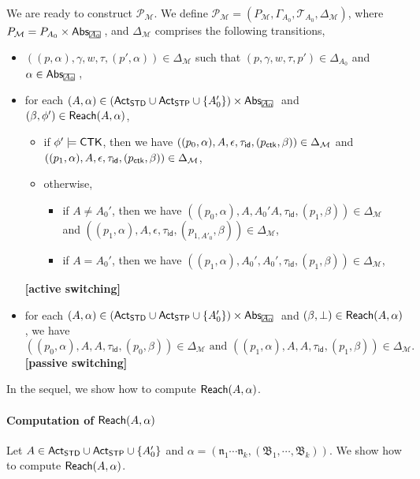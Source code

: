 \documentclass[preprint,12pt]{elsarticle}
\newcommand\rectangled[1]{\tikz[baseline=(torect.base)]{
    \node[shape = rectangle, draw, inner sep=0pt, outer sep = 0pt] (torect) {#1}
    }
}
\newcommand{\mrectangled}[1]{\text{\rectangled{\ensuremath{#1}}}}
\newcommand{\mhcancel}[1]{\mrectangled{#1}}
\newcommand\Mm{{\mathcal{M} }}
\newcommand\Pp{{\mathcal{P} }}
\newcommand\act{{\sf Act}}
\newcommand\standard{{\sf STD}}
\newcommand\singletop{{\sf STP}}
\newcommand\ctkflag{{\sf CTK}}
\newcommand\abs{{\mathsf{Abs} }}
\newcommand\aname{\mathfrak{n}}
\newcommand\reach{{\sf Reach}}
\newcommand{\id}{\mathsf{id}}
\newcommand\AutB{{\mathfrak{B} }}
\newcommand\TranSet{{\mathscr{T} }}
\begin{document}
We are ready to construct $\Pp_\Mm$. 
We define $\Pp_{\Mm} = (P_{\Mm}, \Gamma_{A_0}, \TranSet_{A_0}, \Delta_{\Mm})$, where $P_{\Mm} = P_{A_0} \times \abs_{\mhcancel{A_0}}$, and $\Delta_{\Mm}$ comprises the following transitions,
\begin{itemize}
    \item $((p, \alpha), \gamma, w, \tau, (p', \alpha)) \in \Delta_{\Mm}$ such that $(p, \gamma, w, \tau, p') \in \Delta_{A_0}$ and $\alpha\in\abs_{\mhcancel{A_0}}$,
    \item for each $(A, \alpha) \in (\act_{\standard} \cup \act_{\singletop} \cup \{A_0'\}) \times \abs_{\mhcancel{A_0}}$ and $(\beta,\phi')\in\reach(A,\alpha)$, 
        \begin{itemize}
            \item if $\phi' \models \ctkflag$, then we have $((p_0, \alpha), A, \epsilon, \tau_{\id}, (p_{\sf ctk}, \beta)) \in \Delta_{\Mm}$ and $((p_1, \alpha), A, \epsilon, \tau_{\id}, (p_{\sf ctk}, \beta)) \in \Delta_{\Mm}$,
            \item otherwise,
            \begin{itemize}
                \item if $A\neq A_0'$, then we have
                    $((p_0, \alpha), A, A_0'A, \tau_{\id}, (p_1, \beta)) \in \Delta_{\Mm}$ and $((p_1, \alpha), A, \epsilon, \tau_{\id}, (p_{1, A'_0}, \beta)) \in \Delta_{\Mm}$,
                \item if $A=A_0'$, then we have $((p_1, \alpha), A_0', A_0', \tau_{\id}, (p_1, \beta)) \in \Delta_{\Mm}$,
            \end{itemize}
        \end{itemize}
                \textbf{[active switching]}
    \item for each $(A,\alpha) \in (\act_{\standard} \cup \act_{\singletop} \cup \{A_0'\}) \times \abs_{\mhcancel{A_0}}$ and $(\beta,\bot)\in\reach(A,\alpha)$, we have 
    $$((p_0, \alpha), A, A, \tau_{\id}, (p_0, \beta)) \in \Delta_{\Mm} \mbox{ and } ((p_1, \alpha), A, A, \tau_{\id}, (p_1, \beta)) \in \Delta_{\Mm}.$$
            \textbf{[passive switching]}
\end{itemize}

In the sequel, we show how to compute $\reach(A, \alpha)$. 

\paragraph*{Computation of $\reach(A, \alpha)$}
Let $A \in \act_\standard \cup \act_\singletop \cup \{A'_0\}$ and $\alpha = (\aname_1 \cdots \aname_k, (\AutB_1, \cdots, \AutB_k))$. 
We show how to compute $\reach(A, \alpha)$. 
\end{document}

